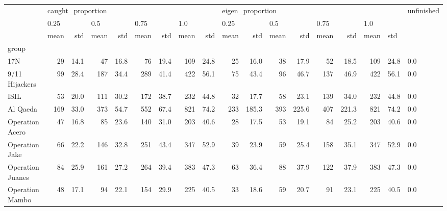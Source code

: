 \begin{tabular}{lrrrrrrrrrrrrrrrrl}
\toprule
{} & \multicolumn{8}{l}{caught\_proportion} & \multicolumn{8}{l}{eigen\_proportion} & unfinished \\
{} & \multicolumn{2}{l}{0.25} & \multicolumn{2}{l}{0.5} & \multicolumn{2}{l}{0.75} & \multicolumn{2}{l}{1.0} & \multicolumn{2}{l}{0.25} & \multicolumn{2}{l}{0.5} & \multicolumn{2}{l}{0.75} & \multicolumn{3}{l}{1.0} \\
{} &              mean &   std & mean &   std & mean &   std & mean &   std &             mean &    std & mean &    std & mean &    std & mean & \multicolumn{2}{l}{std} \\
group                &                   &       &      &       &      &       &      &       &                  &        &      &        &      &        &      &       &            \\
\midrule
17N                  &                29 &  14.1 &   47 &  16.8 &   76 &  19.4 &  109 &  24.8 &               25 &   16.0 &   38 &   17.9 &   52 &   18.5 &  109 &  24.8 &        0.0 \\
9/11 Hijackers       &                99 &  28.4 &  187 &  34.4 &  289 &  41.4 &  422 &  56.1 &               75 &   43.4 &   96 &   46.7 &  137 &   46.9 &  422 &  56.1 &        0.0 \\
ISIL                 &                53 &  20.0 &  111 &  30.2 &  172 &  38.7 &  232 &  44.8 &               32 &   17.7 &   58 &   23.1 &  139 &   34.0 &  232 &  44.8 &        0.0 \\
Al Qaeda             &               169 &  33.0 &  373 &  54.7 &  552 &  67.4 &  821 &  74.2 &              233 &  185.3 &  393 &  225.6 &  407 &  221.3 &  821 &  74.2 &        0.0 \\
Operation Acero      &                47 &  16.8 &   85 &  23.6 &  140 &  31.0 &  203 &  40.6 &               28 &   17.5 &   53 &   19.1 &   84 &   25.2 &  203 &  40.6 &        0.0 \\
Operation Jake       &                66 &  22.2 &  146 &  32.8 &  251 &  43.4 &  347 &  52.9 &               39 &   23.9 &   59 &   25.4 &  158 &   35.1 &  347 &  52.9 &        0.0 \\
Operation Juanes     &                84 &  25.9 &  161 &  27.2 &  264 &  39.4 &  383 &  47.3 &               63 &   36.4 &   88 &   37.9 &  122 &   37.9 &  383 &  47.3 &        0.0 \\
Operation Mambo      &                48 &  17.1 &   94 &  22.1 &  154 &  29.9 &  225 &  40.5 &               33 &   18.6 &   59 &   20.7 &   91 &   23.1 &  225 &  40.5 &        0.0 \\

\end{tabular}
